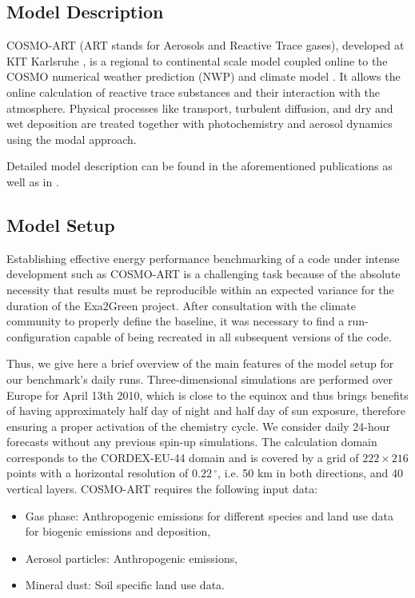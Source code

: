 \subsection{Model Description}
\label{subsec:1.1}
COSMO-ART  (ART  stands  for   Aerosols  and  Reactive  Trace  gases),
developed  at  KIT  Karlsruhe  \citep{Vogel-2009}, is  a  regional  to
continental scale model coupled  online to the COSMO numerical weather
prediction (NWP) and climate model \citep{Baldauf-2011}. It allows the
online calculation of reactive  trace substances and their interaction
with  the atmosphere.   Physical processes  like  transport, turbulent
diffusion,  and  dry and  wet  deposition  are  treated together  with
photochemistry and aerosol dynamics using the modal approach.

Detailed  model  description  can   be  found  in  the  aforementioned
publications  as   well  as  in   \citep{Stanelle-2010,  Bangert-2012,
  Knote-2011, Knote-2013}.

\subsection{Model Setup}
\label{subsec:1.2}
Establishing effective energy performance benchmarking of a code under
intense development such as COSMO-ART is a challenging task because of
the  absolute necessity that  results must  be reproducible  within an
expected  variance for the  duration of  the Exa2Green  project. After
consultation  with  the  climate  community  to  properly  define  the
baseline,  it was  necessary to  find a  run-configuration  capable of
being recreated in all subsequent versions of the code.

Thus, we give here a brief  overview of the main features of the model
setup for  our benchmark's daily  runs.  Three-dimensional simulations
are performed over  Europe for April 13th 2010, which  is close to the
equinox and thus  brings benefits of having approximately  half day of
night  and half  day  of  sun exposure,  therefore  ensuring a  proper
activation of the chemistry cycle. We consider daily 24-hour forecasts
without  any  previous spin-up  simulations.   The calculation  domain
corresponds to  the CORDEX-EU-44  domain and is  covered by a  grid of
$222\times   216$    points   with   a    horizontal   resolution   of
$0.22\,^{\circ}$,  i.e.  50  km in  both directions,  and  40 vertical
layers.   COSMO-ART requires the following input data:

\begin{itemize}
\item  Gas phase:  Anthropogenic emissions  for different  species and
  land use data for biogenic emissions and deposition,
\item Aerosol particles: Anthropogenic emissions,
\item Mineral dust: Soil specific land use data.
\end{itemize}

